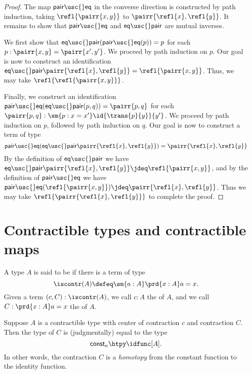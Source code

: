\begin{proof}
The map $\mathsf{pair\usc{}eq}$ in the converse direction is constructed by path induction, taking $\refl{\pairr{x,y}}$ to $\pairr{\refl{x},\refl{y}}$.
It remains to show that $\mathsf{pair\usc{}eq}$ and $\mathsf{eq\usc{}pair}$ are mutual inverses. 

We first show that $\mathsf{eq\usc{}pair}(\mathsf{pair\usc{}eq}(p))=p$ for each $p:\pairr{x,y}=\pairr{x',y'}$. We proceed by path induction on $p$. 
Our goal is now to construct an identification $\mathsf{eq\usc{}pair}\pairr{\refl{x},\refl{y}}=\refl{\pairr{x,y}}$. 
Thus, we may take $\refl{\refl{\pairr{x,y}}}$.

Finally, we construct an identification $\mathsf{pair\usc{}eq}(\mathsf{eq\usc{}pair}(p,q))=\pairr{p,q}$ for each $\pairr{p,q}:\sm{p:x=x'}\id{\trans{p}{y}}{y'}$. We proceed by path induction on $p$, followed by path induction on $q$. Our goal is now to construct a term of type
\begin{equation*}
\mathsf{pair\usc{}eq}(\mathsf{eq\usc{}pair}\pairr{\refl{x},\refl{y}})=\pairr{\refl{x},\refl{y}}
\end{equation*}
By the definition of $\mathsf{eq\usc{}pair}$ we have $\mathsf{eq\usc{}pair}\pairr{\refl{x},\refl{y}}\jdeq \refl{\pairr{x,y}}$, and by the definition of $\mathsf{pair\usc{}eq}$ we have $\mathsf{pair\usc{}eq}(\refl{\pairr{x,y}})\jdeq\pairr{\refl{x},\refl{y}}$. Thus we may take $\refl{\pairr{\refl{x},\refl{y}}}$ to complete the proof.
\end{proof}


\section{Contractible types and contractible maps}

\begin{defn}
A type $A$ is said to be  if there is a term of type
\begin{equation*}
\iscontr(A) \defeq \sm{a:A}\prd{x:A}a=x.
\end{equation*}
Given a term $(c,C):\iscontr(A)$, we call $c:A$ the  of $A$, and we call $C:\prd{x:A}a=x$ the  of $A$.
\end{defn}

\begin{rmk}
Suppose $A$ is a contractible type with center of contraction $c$ and contraction $C$. Then the type of $C$ is (judgmentally) equal to the type
\begin{equation*}
\mathsf{const}_a\htpy\idfunc[A].
\end{equation*}
In other words, the contraction $C$ is a \emph{homotopy} from the constant function to the identity function.
\end{rmk}

